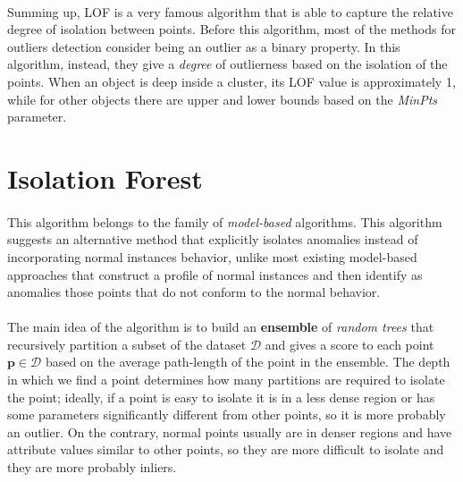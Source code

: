 \paragraph{}
Summing up, LOF is a very famous algorithm that is able to capture the relative degree of isolation between points. Before this algorithm, most of the methods for outliers detection consider being an outlier as a binary property. In this algorithm, instead, they give a \textit{degree} of outlierness based on the isolation of the points. When an object is deep inside a cluster, its LOF value is approximately 1, while for other objects there are upper and lower bounds based on the \textit{MinPts} parameter.

\section{Isolation Forest}
\label{sec:ifor}
\paragraph{}
This algorithm \cite{ifor} belongs to the family of \textit{model-based} algorithms. This algorithm suggests an alternative method that explicitly isolates anomalies instead of incorporating normal instances behavior, unlike most existing model-based approaches that construct a profile of normal instances and then identify as anomalies those points that do not conform to the normal behavior. 

\paragraph{}
The main idea of the algorithm is to build an \textbf{ensemble} of \textit{random trees} that recursively partition a subset of the dataset $\mathcal{D}$ and gives a score to each point $\textbf{p} \in \mathcal{D}$ based on the average path-length of the point in the ensemble. The depth in which we find a point determines how many partitions are required to isolate the point; ideally, if a point is easy to isolate it is in a less dense region or has some parameters significantly different from other points, so it is more probably an outlier. On the contrary, normal points usually are in denser regions and have attribute values similar to other points, so they are more difficult to isolate and they are more probably inliers.

